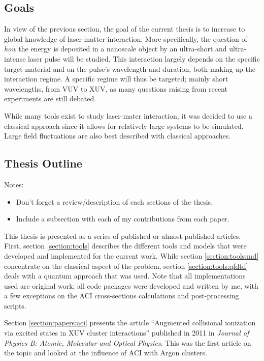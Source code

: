 \subsection{Goals}

In view of the previous section, the goal of the current thesis is to increase
to global knowledge of laser-matter interaction. More specifically, the
question of \textit{how} the energy is deposited in a nanoscale object by an
ultra-short and ultra-intense laser pulse will be studied. This interaction
largely depends on the specific target material and on the pulse's wavelength
and duration, both making up the interaction regime. A specific regime will
thus be targeted; mainly short wavelengths, from VUV to XUV, as many questions
raising from recent experiments are still debated.

While many tools exist to study laser-mater interaction, it was decided to use
a classical approach since it allows for relatively large systems to be
simulated. Large field fluctuations are also best described with
classical approaches\cite{Fennel2010}.

\cite{Young2010,Chapman2011}


\subsection{Thesis Outline}
Notes:
\begin{itemize}
\item Don't forget a review/description of each sections of the thesis.
\item Include a subsection with each of my contributions from each paper.
\end{itemize}

This thesis is presented as a series of published or almost published articles.
First, section \ref{section:tools} describes the different tools and models
that were developed and implemented for the current work. While section
\ref{section:tools:md} concentrate on the classical aspect of the problem,
section \ref{section:tools:qfdtd} deals with a quantum approach that was
used. Note that all implementations used are original work; all code packages
were developed and written by me, with a few exceptions on the ACI
cross-sections calculations and post-processing scripts.

Section \ref{section:papers:aci} presents the article ``Augmented collisional
ionization via excited states in XUV cluster interactions'' published in 2011
in \textit{Journal of Physics B: Atomic, Molecular and Optical Physics}. This
was the first article on the topic and looked at the influence of ACI with Argon
clusters.

